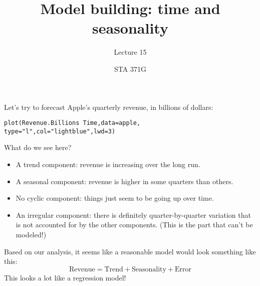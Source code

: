 \documentclass{beamer}\usepackage[]{graphicx}\usepackage[]{color}
\title{Model building: time and seasonality}
\subtitle{Lecture 15}
\author{STA 371G}
\makeatletter
\newcommand{\hlnum}[1]{\textcolor[rgb]{0.824,0.412,0.118}{#1}}%
\newcommand{\hlstr}[1]{\textcolor[rgb]{1,0.894,0.71}{#1}}%
\newcommand{\hlopt}[1]{\textcolor[rgb]{1,0.894,0.769}{#1}}%
\newcommand{\hlstd}[1]{\textcolor[rgb]{1,0.894,0.769}{#1}}%
\newcommand{\hlkwc}[1]{\textcolor[rgb]{0.78,0.941,0.545}{#1}}%
\newcommand{\hlkwd}[1]{\textcolor[rgb]{1,0.78,0.769}{#1}}%
\newenvironment{kframe}{%
 \def\at@end@of@kframe{}%
 \ifinner\ifhmode%
  \def\at@end@of@kframe{\end{minipage}}%
  \begin{minipage}{\columnwidth}%
 \fi\fi%
 \def\FrameCommand##1{\hskip\@totalleftmargin \hskip-\fboxsep
 \colorbox{shadecolor}{##1}\hskip-\fboxsep
     \hskip-\linewidth \hskip-\@totalleftmargin \hskip\columnwidth}%
 \MakeFramed {\advance\hsize-\width
   \@totalleftmargin\z@ \linewidth\hsize
   \@setminipage}}%
 {\par\unskip\endMakeFramed%
 \at@end@of@kframe}
\newenvironment{knitrout}{}{} %
\makeatother
\begin{document}
  
  

  \frame{\maketitle}



  \begin{darkframes}
    \begin{frame}[fragile]
      \fontsm
      Let's try to forecast Apple's quarterly revenue, in billions of dollars:
\begin{knitrout}
\begin{kframe}
\begin{alltt}
\hlkwd{plot}\hlstd{(Revenue.Billions} \hlopt{~} \hlstd{Time,} \hlkwc{data}\hlstd{=apple,}
  \hlkwc{type}\hlstd{=}\hlstr{"l"}\hlstd{,} \hlkwc{col}\hlstd{=}\hlstr{"lightblue"}\hlstd{,} \hlkwc{lwd}\hlstd{=}\hlnum{3}\hlstd{)}
\end{alltt}
\end{kframe}


\end{knitrout}
    \end{frame}

    \begin{frame}
      What do we see here?
      \begin{itemize}[<+->]
        \item \greencheckmark A \alert{trend} component: revenue is increasing over the long run.
        \item \greencheckmark A \alert{seasonal} component: revenue is higher in some quarters than others.
        \item \redx No \alert{cyclic} component: things just seem to be going up over time.
        \item \greencheckmark An \alert{irregular} component: there is definitely quarter-by-quarter variation that is not accounted for by the other components. (This is the part that can't be modeled!)
      \end{itemize}
    \end{frame}

    \begin{frame}
      Based on our analysis, it seems like a reasonable model would look something like   this:
      \[
        \text{Revenue} = \text{Trend} + \text{Seasonality} + \text{Error}
      \]
      This looks a lot like a regression model!
    \end{frame}


\end{darkframes}
\end{document}
